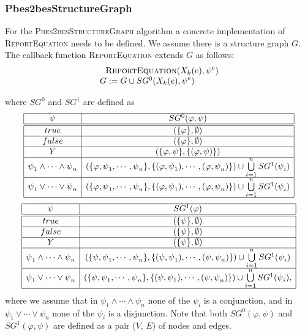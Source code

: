 \subsubsection{Pbes2besStructureGraph}

For the \textsc{Pbes2besStructureGraph} algorithm a concrete implementation of \textsc{ReportEquation}
needs to be defined. We assume there is a structure graph $G$. The callback function
\textsc{ReportEquation} extends $G$ as follows:%
\begin{equation*}
\begin{array}{l}
\text{\textsc{ReportEquation}}(X_{k}(e),\psi ^{e}) \\
G:=G\cup SG^{0}(X_{k}(e),\psi ^{e})%
\end{array}%
\end{equation*}

where $SG^{0}$ and $SG^{1}$ are defined as%
\begin{equation*}
\begin{array}{|c|c|}
\hline
\psi & SG^{0}(\varphi ,\psi ) \\ \hline\hline
true & (\{\varphi \},\emptyset ) \\ \hline
false & (\{\varphi \},\emptyset ) \\ \hline
Y & (\{\varphi ,\psi \},\{(\varphi ,\psi )\}) \\ \hline
\psi _{1}\wedge \cdots \wedge \psi _{n} & \left( \{\varphi ,\psi _{1},\cdots
,\psi _{n}\},\{(\varphi ,\psi _{1}),\cdots ,(\varphi ,\psi _{n})\}\right)
\cup \bigcup\limits_{i=1}^{n}SG^{1}(\psi _{i}) \\ \hline
\psi _{1}\vee \cdots \vee \psi _{n} & \left( \{\varphi ,\psi _{1},\cdots
,\psi _{n}\},\{(\varphi ,\psi _{1}),\cdots ,(\varphi ,\psi _{n})\}\right)
\cup \bigcup\limits_{i=1}^{n}SG^{1}(\psi _{i}) \\ \hline
\end{array}%
\end{equation*}%
\begin{equation*}
\begin{array}{|c|c|}
\hline
\psi & SG^{1}(\varphi ) \\ \hline\hline
true & (\{\psi \},\emptyset ) \\ \hline
false & (\{\psi \},\emptyset ) \\ \hline
Y & (\{\psi \},\emptyset ) \\ \hline
\psi _{1}\wedge \cdots \wedge \psi _{n} & \left( \{\psi ,\psi _{1},\cdots
,\psi _{n}\},\{(\psi ,\psi _{1}),\cdots ,(\psi ,\psi _{n})\}\right) \cup
\bigcup\limits_{i=1}^{n}SG^{1}(\psi _{i}) \\ \hline
\psi _{1}\vee \cdots \vee \psi _{n} & \left( \{\psi ,\psi _{1},\cdots ,\psi
_{n}\},\{(\psi ,\psi _{1}),\cdots ,(\psi ,\psi _{n})\}\right) \cup
\bigcup\limits_{i=1}^{n}SG^{1}(\psi _{i}), \\ \hline
\end{array}%
\end{equation*}%
where we assume that in $\psi _{1}\wedge \cdots \wedge \psi _{n}$ none of
the $\psi _{i}$ is a conjunction, and in $\psi _{1}\vee \cdots \vee \psi
_{n} $ none of the $\psi _{i}$ is a disjunction.
Note that both $SG^{0}(\varphi ,\psi)$ and $SG^{1}(\varphi ,\psi )$ are defined as a pair ($V$, $E$) of
nodes and edges.
\newpage
